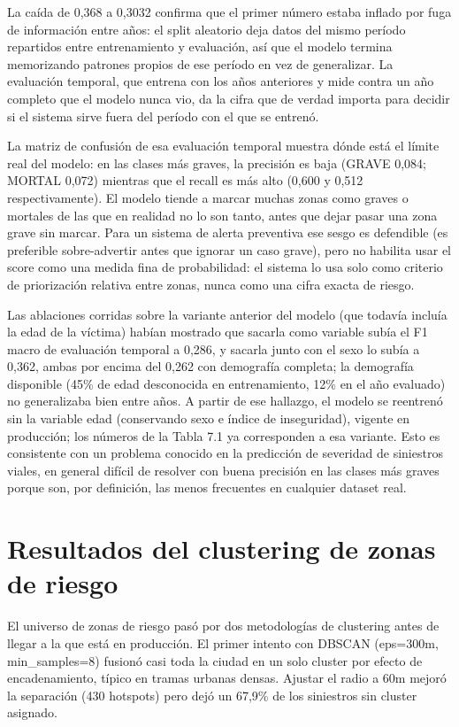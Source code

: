 La caída de 0,368 a 0,3032 confirma que el primer número estaba inflado
por fuga de información entre años: el split aleatorio deja datos del
mismo período repartidos entre entrenamiento y evaluación, así que el
modelo termina memorizando patrones propios de ese período en vez de
generalizar. La evaluación temporal, que entrena con los años anteriores
y mide contra un año completo que el modelo nunca vio, da la cifra que
de verdad importa para decidir si el sistema sirve fuera del período con
el que se entrenó.

La matriz de confusión de esa evaluación temporal muestra dónde está el
límite real del modelo: en las clases más graves, la precisión es baja
(GRAVE 0,084; MORTAL 0,072) mientras que el recall es más alto (0,600 y
0,512 respectivamente). El modelo tiende a marcar muchas zonas como
graves o mortales de las que en realidad no lo son tanto, antes que
dejar pasar una zona grave sin marcar. Para un sistema de alerta
preventiva ese sesgo es defendible (es preferible sobre-advertir antes
que ignorar un caso grave), pero no habilita usar el score como una
medida fina de probabilidad: el sistema lo usa solo como criterio de
priorización relativa entre zonas, nunca como una cifra exacta de
riesgo.

Las ablaciones corridas sobre la variante anterior del modelo (que
todavía incluía la edad de la víctima) habían mostrado que sacarla como
variable subía el F1 macro de evaluación temporal a 0,286, y sacarla
junto con el sexo lo subía a 0,362, ambas por encima del 0,262 con
demografía completa; la demografía disponible (45\% de edad desconocida
en entrenamiento, 12\% en el año evaluado) no generalizaba bien entre
años. A partir de ese hallazgo, el modelo se reentrenó sin la variable
edad (conservando sexo e índice de inseguridad), vigente en producción;
los números de la Tabla 7.1 ya corresponden a esa variante. Esto es
consistente con un problema conocido en la predicción de severidad de
siniestros viales, en general difícil de resolver con buena precisión en
las clases más graves porque son, por definición, las menos frecuentes
en cualquier dataset real.

\section{Resultados del clustering de zonas de riesgo}

El universo de zonas de riesgo pasó por dos metodologías de clustering
antes de llegar a la que está en producción. El primer intento con
DBSCAN (eps=300m, min\_samples=8) fusionó casi toda la ciudad en un solo
cluster por efecto de encadenamiento, típico en tramas urbanas densas.
Ajustar el radio a 60m mejoró la separación (430 hotspots) pero dejó un
67,9\% de los siniestros sin cluster asignado.

